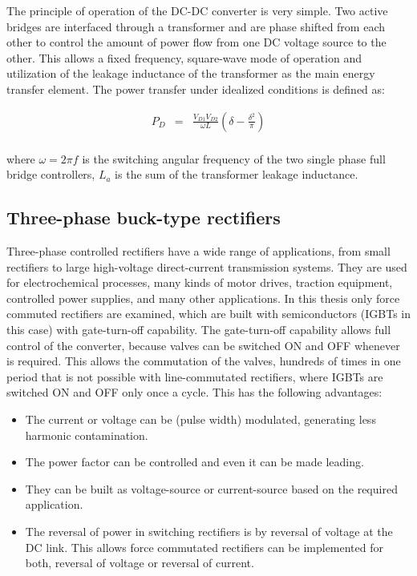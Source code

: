 The principle of operation of the DC-DC converter is very simple. Two active bridges are interfaced through a transformer and are phase shifted from each other to control the amount of power flow from one DC voltage source to the other. This allows a fixed frequency, square-wave mode of operation and utilization of the leakage inductance of the transformer as the main energy transfer element. The power transfer under idealized conditions is defined as:

\begin{equation}
        \begin{array}{rcl}
            P_D&=&\frac{V_{D1}V_{D2}}{\omega L}\left(\delta-\frac{\delta^2}{\pi}\right)\\
        \end{array}
        \label{BASICMPC:equ:DCDC}
    \end{equation}
		
		where $\omega=2\pi f$ is the switching angular frequency of the two single phase full bridge controllers, $L_a$ is the
sum of the transformer leakage inductance. 

\subsection{Three-phase buck-type rectifiers}\label{BASICCSR:sec:CSR}

Three-phase controlled rectifiers have a wide range of applications, from small rectifiers to large high-voltage direct-current
transmission systems. They are used for electrochemical processes, many kinds of motor drives, traction equipment, controlled power supplies, and many other applications. In this thesis only force commuted rectifiers are examined, which are built with semiconductors (IGBTs in this case) with gate-turn-off capability. The gate-turn-off capability allows full control of the converter, because valves can be switched ON and OFF whenever is required. This allows the commutation of the valves, hundreds of times in one period that is not possible with line-commutated rectifiers, where IGBTs are switched ON and OFF only once a cycle. This has the following advantages:

\begin{itemize}
\item The current or voltage can be (pulse width) modulated, generating less harmonic contamination.
\item The power factor can be controlled and even it can be made leading.
\item They can be built as voltage-source or current-source based on the required application.
\item The reversal of power in switching rectifiers is by reversal of voltage at the DC link. This allows force commutated rectifiers can be implemented for both, reversal of voltage or reversal of current.
\end{itemize}

